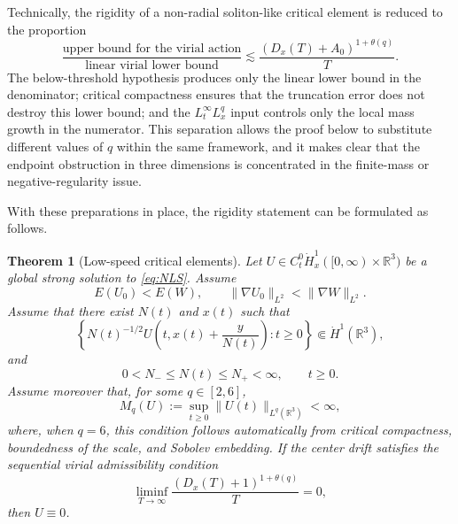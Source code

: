 \documentclass[smallextended,envcountsect,nospthms]{svjour3}
\numberwithin{equation}{section}
\theoremstyle{spbreak}
\newtheorem{theorem}{Theorem}[section]
\theoremstyle{spdefbreak}
\theoremstyle{spdefbreak}
\newcommand{\R}{\mathbb R}
\begin{document}
Technically, the rigidity of a non-radial soliton-like critical element is reduced to the proportion
\[
  \frac{\text{upper bound for the virial action}}{\text{linear virial lower bound}}
  \lesssim
  \frac{(D_x(T)+A_0)^{1+\theta(q)}}{T}.
\]
The below-threshold hypothesis produces only the linear lower bound in the denominator; critical compactness ensures that the truncation error does not destroy this lower bound; and the $L_t^\infty L_x^q$ input controls only the local mass growth in the numerator. This separation allows the proof below to substitute different values of $q$ within the same framework, and it makes clear that the endpoint obstruction in three dimensions is concentrated in the finite-mass or negative-regularity issue.

With these preparations in place, the rigidity statement can be formulated as follows.

\begin{theorem}[Low-speed critical elements]\label{thm:rigidity-general}
Let $U\in C_t^0\dot H_x^1([0,\infty)\times\R^3)$ be a global strong solution to \eqref{eq:NLS}. Assume
\[
  E(U_0)<E(W),
  \qquad \|\nabla U_0\|_{L^2}<\|\nabla W\|_{L^2}.
\]
Assume that there exist $N(t)$ and $x(t)$ such that
\[
  \left\{N(t)^{-1/2}U\left(t,x(t)+\frac{y}{N(t)}\right):t\ge0\right\}
  \Subset\dot H^1(\R^3),
\]
and
\[
  0<N_-\le N(t)\le N_+<\infty,
  \qquad t\ge0.
\]
Assume moreover that, for some $q\in[2,6]$,
\[
  M_q(U):=\sup_{t\ge0}\|U(t)\|_{L^q(\R^3)}<\infty,
\]
where, when $q=6$, this condition follows automatically from critical compactness, boundedness of the scale, and Sobolev embedding. If the center drift satisfies the sequential virial admissibility condition
\begin{equation}\label{eq:rigidity-drift-general}
  \liminf_{T\to\infty}
  \frac{(D_x(T)+1)^{1+\theta(q)}}{T}=0,
\end{equation}
then $U\equiv0$.
\end{theorem}
\end{document}
